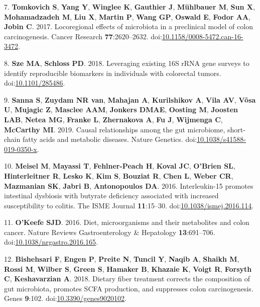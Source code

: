 \documentclass[11pt,]{article}
\begin{document}
\leavevmode\hypertarget{ref-Tomkovich2017}{}%
7. \textbf{Tomkovich S}, \textbf{Yang Y}, \textbf{Winglee K},
\textbf{Gauthier J}, \textbf{Mühlbauer M}, \textbf{Sun X},
\textbf{Mohamadzadeh M}, \textbf{Liu X}, \textbf{Martin P}, \textbf{Wang
GP}, \textbf{Oswald E}, \textbf{Fodor AA}, \textbf{Jobin C}. 2017.
Locoregional effects of microbiota in a preclinical model of colon
carcinogenesis. Cancer Research \textbf{77}:2620--2632.
doi:\href{https://doi.org/10.1158/0008-5472.can-16-3472}{10.1158/0008-5472.can-16-3472}.

\leavevmode\hypertarget{ref-Sze2018}{}%
8. \textbf{Sze MA}, \textbf{Schloss PD}. 2018. Leveraging existing 16S
rRNA gene surveys to identify reproducible biomarkers in individuals
with colorectal tumors.
doi:\href{https://doi.org/10.1101/285486}{10.1101/285486}.

\leavevmode\hypertarget{ref-Sanna2019}{}%
9. \textbf{Sanna S}, \textbf{Zuydam NR van}, \textbf{Mahajan A},
\textbf{Kurilshikov A}, \textbf{Vila AV}, \textbf{Võsa U},
\textbf{Mujagic Z}, \textbf{Masclee AAM}, \textbf{Jonkers DMAE},
\textbf{Oosting M}, \textbf{Joosten LAB}, \textbf{Netea MG},
\textbf{Franke L}, \textbf{Zhernakova A}, \textbf{Fu J},
\textbf{Wijmenga C}, \textbf{McCarthy MI}. 2019. Causal relationships
among the gut microbiome, short-chain fatty acids and metabolic
diseases. Nature Genetics.
doi:\href{https://doi.org/10.1038/s41588-019-0350-x}{10.1038/s41588-019-0350-x}.

\leavevmode\hypertarget{ref-Meisel2016}{}%
10. \textbf{Meisel M}, \textbf{Mayassi T}, \textbf{Fehlner-Peach H},
\textbf{Koval JC}, \textbf{O'Brien SL}, \textbf{Hinterleitner R},
\textbf{Lesko K}, \textbf{Kim S}, \textbf{Bouziat R}, \textbf{Chen L},
\textbf{Weber CR}, \textbf{Mazmanian SK}, \textbf{Jabri B},
\textbf{Antonopoulos DA}. 2016. Interleukin-15 promotes intestinal
dysbiosis with butyrate deficiency associated with increased
susceptibility to colitis. The ISME Journal \textbf{11}:15--30.
doi:\href{https://doi.org/10.1038/ismej.2016.114}{10.1038/ismej.2016.114}.

\leavevmode\hypertarget{ref-OKeefe2016}{}%
11. \textbf{O'Keefe SJD}. 2016. Diet, microorganisms and their
metabolites and colon cancer. Nature Reviews Gastroenterology \&
Hepatology \textbf{13}:691--706.
doi:\href{https://doi.org/10.1038/nrgastro.2016.165}{10.1038/nrgastro.2016.165}.

\leavevmode\hypertarget{ref-Bishehsari2018}{}%
12. \textbf{Bishehsari F}, \textbf{Engen P}, \textbf{Preite N},
\textbf{Tuncil Y}, \textbf{Naqib A}, \textbf{Shaikh M}, \textbf{Rossi
M}, \textbf{Wilber S}, \textbf{Green S}, \textbf{Hamaker B},
\textbf{Khazaie K}, \textbf{Voigt R}, \textbf{Forsyth C},
\textbf{Keshavarzian A}. 2018. Dietary fiber treatment corrects the
composition of gut microbiota, promotes SCFA production, and suppresses
colon carcinogenesis. Genes \textbf{9}:102.
doi:\href{https://doi.org/10.3390/genes9020102}{10.3390/genes9020102}.
\end{document}
